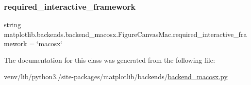 \subsubsection{\texorpdfstring{required\+\_\+interactive\+\_\+framework}{required\_interactive\_framework}}
{\footnotesize\ttfamily string matplotlib.\+backends.\+backend\+\_\+macosx.\+Figure\+Canvas\+Mac.\+required\+\_\+interactive\+\_\+framework = \char`\"{}macosx\char`\"{}\hspace{0.3cm}{\ttfamily [static]}}



The documentation for this class was generated from the following file\+:\begin{DoxyCompactItemize}
\item 
venv/lib/python3./site-\/packages/matplotlib/backends/\hyperlink{backend__macosx_8py}{backend\+\_\+macosx.\+py}\end{DoxyCompactItemize}
